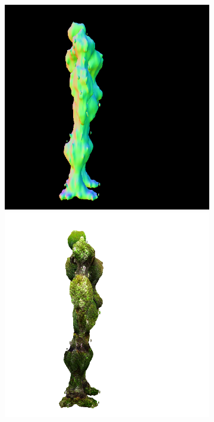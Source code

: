 \begin{figure}[ht]
\begin{subfigure}[b]{0.222\textwidth}
        \caption{}
    \end{subfigure}
    \begin{subfigure}[b]{0.222\textwidth}
        \centering
        \fontsize{9pt}{7pt}\selectfont{}\vspace{.1cm}
        \includegraphics[width=\textwidth]{figures/appendix/magic123_refine_robot_right_5000_part2.png}
        \includegraphics[width=\textwidth]{figures/appendix/magic123_refine_robot_right_5000_part1.png}

\end{subfigure}
\end{figure}
